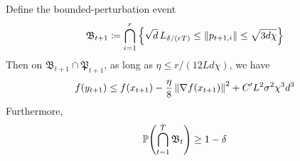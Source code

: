 \begin{lemma}
    Define the bounded-perturbation event
    \begin{align*}
        \mathfrak B_{t+1} \coloneqq \bigcap_{i=1}^r \set{\sqrt d\,L_{\delta/(rT)} \leq \mg{p_{t+1,i}} \leq \sqrt{3d \chi}}
    \end{align*}
    Then on $\mathfrak B_{t+1} \cap \mathfrak P_{t+1}$, as long as $\eta \leq r/(12Ld \chi)$, we have
    \begin{align*}
        f(y_{t+1}) \leq f(x_{t+1}) - \frac{\eta}{8} \mg{\grad f(x_{t+1})}^2 + C'L^2 \sigma^2 \chi^3 d^{3} 
    \end{align*}
    Furthermore, 
    \begin{align*}
        \P(\bigcap_{t=1}^{T}\mathfrak B_{t}) \geq 1-\delta
    \end{align*}
\end{lemma}
